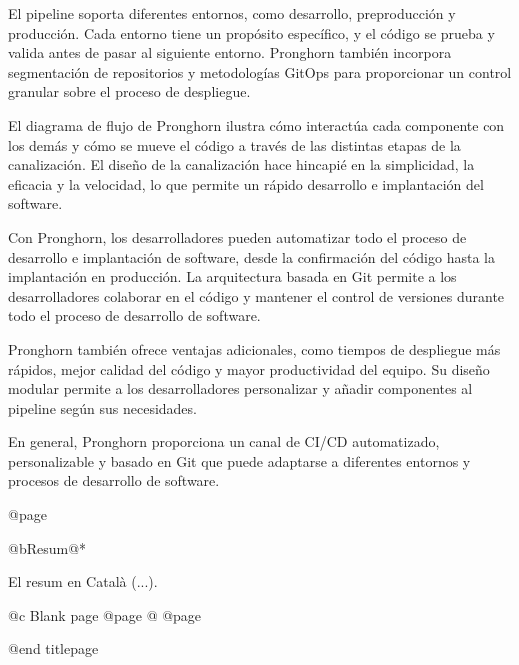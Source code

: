 El pipeline soporta diferentes entornos, como desarrollo, preproducción y producción. Cada entorno tiene un propósito específico, y el código se prueba y valida antes de pasar al siguiente entorno. Pronghorn también incorpora segmentación de repositorios y metodologías GitOps para proporcionar un control granular sobre el proceso de despliegue.

El diagrama de flujo de Pronghorn ilustra cómo interactúa cada componente con los demás y cómo se mueve el código a través de las distintas etapas de la canalización. El diseño de la canalización hace hincapié en la simplicidad, la eficacia y la velocidad, lo que permite un rápido desarrollo e implantación del software.

Con Pronghorn, los desarrolladores pueden automatizar todo el proceso de desarrollo e implantación de software, desde la confirmación del código hasta la implantación en producción. La arquitectura basada en Git permite a los desarrolladores colaborar en el código y mantener el control de versiones durante todo el proceso de desarrollo de software.

Pronghorn también ofrece ventajas adicionales, como tiempos de despliegue más rápidos, mejor calidad del código y mayor productividad del equipo. Su diseño modular permite a los desarrolladores personalizar y añadir componentes al pipeline según sus necesidades.

En general, Pronghorn proporciona un canal de CI/CD automatizado, personalizable y basado en Git que puede adaptarse a diferentes entornos y procesos de desarrollo de software.

@page

@b{Resum}@*

El resum en Català (...).

@c Blank page
@page
@
@page

@end titlepage

